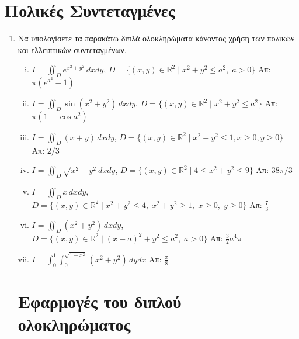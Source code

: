 



\geometry{top=2.5cm}
\pagestyle{askhseis}
\everymath{\displaystyle}





\begin{center}
  \minibox{\large\bf \textcolor{Col1}{Ασκήσεις Διπλό Ολοκλήρωμα}}
\end{center}


\section*{Πολικές Συντεταγμένες}

\begin{enumerate}
  \item Να υπολογίσετε τα παρακάτω διπλά ολοκληρώματα κάνοντας χρήση των πολικών 
    και ελλειπτικών συντεταγμένων.
    \begin{enumerate}[i)]
      \item $I=\iint_{D}e^{x^2+y^2}\,dxdy$, 
        \quad $D=\{(x,y)\in\mathbb{R}^2 \mid x^2+y^2\leq a^2,\; a>0\}$ 
        \hfill Απ: $\pi(e^{a^2}-1)$ %
      \item $I=\iint_{D}\sin(x^2+y^2)\,dxdy$, \quad $D= \{(x,y)\in \mathbb{R}^{2} 
        \mid x^{2}+y^{2} \leq a^{2} \}$ 
        \hfill Απ: $\pi (1 - \cos{a^{2}}) $
      \item $I=\iint_{D}(x+y)\,dxdy$, \quad $ D= \{(x,y)\in \mathbb{R}^{2} 
        \mid x^{2}+y^{2} \leq 1, x \geq 0, y \geq 0 \} $ 
        \hfill Απ: $2/3$
      \item $I=\iint_{D}\sqrt{x^2+y^2}\,dxdy$, \quad $ D= \{(x,y)\in \mathbb{R}^{2} 
        \mid 4 \leq x^{2}+y^{2} \leq 9 \} $ 
        \hfill Απ: $38 \pi /3$
      \item $I=\iint_{D}x\,dxdy$, \quad $ D= \{(x,y)\in \mathbb{R}^{2} \mid x^{2}+y^{2} 
        \leq 4,\; x^{2}+y^{2} \geq 1,\; x \geq 0,\; y \geq 0 \} $ 
        \hfill Απ: $ \frac{7}{3} $ %
      \item $I=\iint_{D}(x^2+y^2)\,dxdy$, \quad $ D= \{(x,y)\in \mathbb{R}^{2} 
        \mid (x-a)^{2}+y^{2} \leq a^{2},\; a>0 \}  $ 
        \hfill Απ: $\frac{3}{2}a^4\pi$
      \item $I=\int_{0}^{1} \int _{0}^{\sqrt{1-x^{2}}} (x^2+y^2)\,dydx$ 
        \hfill Απ: $ \frac{\pi}{8} $ 
    \end{enumerate}


    \section*{Εφαρμογές του διπλού ολοκληρώματος} 


\end{enumerate}
